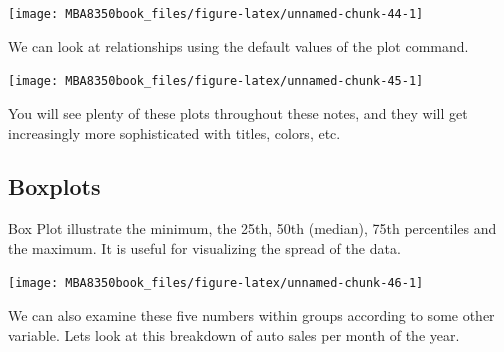 \documentclass[
]{book}
\newenvironment{Shaded}{\begin{snugshade}}{\end{snugshade}}
\newcommand{\FunctionTok}[1]{\textcolor[rgb]{0.00,0.00,0.00}{#1}}
\newcommand{\NormalTok}[1]{#1}
\newcommand{\SpecialCharTok}[1]{\textcolor[rgb]{0.00,0.00,0.00}{#1}}
\begin{document}
\begin{center}\texttt{[image: MBA8350book\_files/figure-latex/unnamed-chunk-44-1]} \end{center}

We can look at relationships using the default values of the plot command.

\begin{Shaded}
\end{Shaded}

\begin{center}\texttt{[image: MBA8350book\_files/figure-latex/unnamed-chunk-45-1]} \end{center}

You will see plenty of these plots throughout these notes, and they will get increasingly more sophisticated with titles, colors, etc.

\hypertarget{boxplots}{%
\subsection{Boxplots}\label{boxplots}}

Box Plot illustrate the minimum, the 25th, 50th (median), 75th percentiles and the maximum. It is useful for visualizing the spread of the data.

\begin{Shaded}
\end{Shaded}

\begin{center}\texttt{[image: MBA8350book\_files/figure-latex/unnamed-chunk-46-1]} \end{center}

We can also examine these five numbers within groups according to some other variable. Lets look at this breakdown of auto sales per month of the year.

\begin{Shaded}
\end{Shaded}
\end{document}
